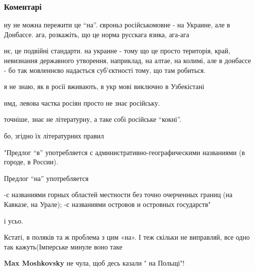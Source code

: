  
 
 
 
 
\subsubsection{Коментарі}

\begin{itemize} %

ну не можна пережити це \enquote{на}. євроньз російськомовне - на Украине, але
в Донбассе. ага, розкажіть, що це норма русскага язика, ага-ага

\begin{itemize} %

нє, це подвійні стандарти. на украине - тому що це просто територія, край,
невизнання державного утворення, наприклад, на алтае, на колимі, але в донбассе
- бо так мовленнєво надається суб'єктності тому, що там робиться.

я не знаю, як в росії вживають, в укр мові виключно в Узбекістані


нмд, левова частка росіян просто не знає російську.

точніше, знає не літературну, а таке собі російське \enquote{кокні}.

бо, згідно їх літературних правил

"Предлог \enquote{в} употребляется с административно-географическими названиями (в городе, в России).

Предлог \enquote{на} употребляется

-с названиями горных областей местности без точно очерченных границ (на Кавказе, на Урале);
-с названиями островов и островных государств"

і усьо.
\end{itemize} %


Кстаті, в поляків та ж проблема з цим «на». І теж скільки не виправляй, все
одно так кажуть(Імперське минуле воно таке

\begin{itemize} %
\textbf{Max Moshkovsky} не чула, щоб десь казали " на Польщі"!


\end{itemize}
\end{itemize}
